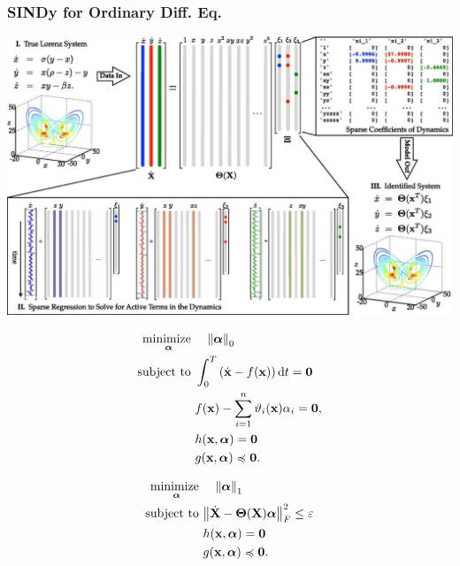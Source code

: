 \documentclass[aspectratio=169,compress,12pt,dvipsnames]{beamer}
\newcommand{\allzeros}{\ensuremath{\mathbf{0}}}
\DeclareMathOperator*{\minimize}{minimize~}
\DeclareMathOperator{\subto}{subject~to~}
\begin{document}
\begin{frame}
    \frametitle{SINDy for Ordinary Diff. Eq.}
    \vfill
    \centering
    \includegraphics[height=.8\textheight]{imgs/sindy_paper.png}
    \vfill
\end{frame}

\begin{frame}
    \vfill
    \[
    \begin{aligned}
        \minimize_{\boldsymbol{\alpha}} & \quad \norm{\boldsymbol{\alpha}}_0                                                                 \\
        \subto                          & \int_{0}^T \left( \dot{\vb{x}} - f(\vb{x}) \right) \dd t = \allzeros \\
                                        & f(\vb{x}) - \sum_{i=1}^n \vartheta_i(\vb{x}) \alpha_i = \allzeros, \\
                                        & h(\vb{x}, \boldsymbol{\alpha}) = \allzeros \\
                                        & g(\vb{x}, \boldsymbol{\alpha}) \preccurlyeq \allzeros.
    \end{aligned}
    \]
    \vfill
\end{frame}

\begin{frame}
    \vfill
    \[
    \begin{aligned}
        \minimize_{\boldsymbol{\alpha}} & \quad \norm{\boldsymbol{\alpha}}_1 \\
        \subto                          & \norm{\dot{\vb{X}} - \boldsymbol{\Theta}(\vb{X}) \boldsymbol{\alpha}}_F^2 \leq \varepsilon \\
                                        & h(\vb{x}, \boldsymbol{\alpha}) = \allzeros                                                         \\
                                        & g(\vb{x}, \boldsymbol{\alpha}) \preccurlyeq \allzeros.
    \end{aligned}
    \]
    \vfill
\end{frame}
\end{document}
